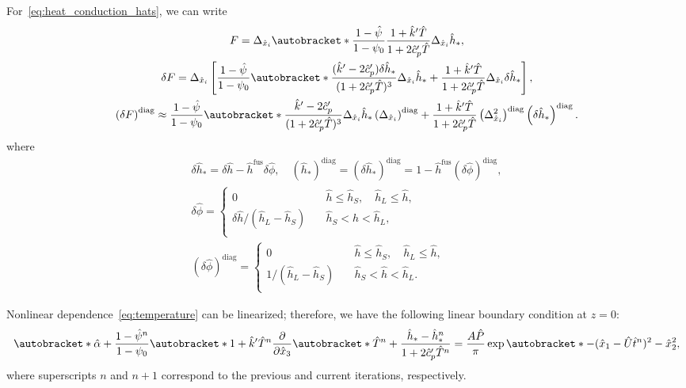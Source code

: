 \documentclass{article}
\newcommand{\dder}[2][]{\Delta_{#2}#1}
\newcommand{\pder}[2][]{\frac{\partial#1}{\partial#2}}
\DeclarePairedDelimiter\autobracket()       %
\newcommand{\br}[1]{\autobracket*{#1}}
\newcommand{\pert}[1]{\delta#1}
\newcommand{\diag}[1]{\left(#1\right)^\mathrm{diag}}
\newcommand{\fusion}[1]{{#1}^\mathrm{fus}}
\begin{document}
For~\eqref{eq:heat_conduction_hats}, we can write
\begin{gather}
    F = \dder{\hat{x}_i}\br{
        \frac{1 - \hat{\psi}}{1 - \psi_0}
	    \frac{1 + \hat{k}'\hat{T}}{1 + 2\hat{c}_p'\hat{T}}
	    \dder[\hat{h}_*]{\hat{x}_i}
	}, \\
    \pert{F} = \dder{\hat{x}_i}\left[ \frac{1 - \hat{\psi}}{1 - \psi_0} \br{
	    \frac{(\hat{k}' - 2\hat{c}_p')\pert{\hat{h}_*}}{(1 + 2\hat{c}_p'\hat{T})^3}
	     \dder[\hat{h}_*]{\hat{x}_i}
	    +
	    \frac{1 + \hat{k}'\hat{T}}{1 + 2\hat{c}_p'\hat{T}}
	    \dder[\pert{\hat{h}_*}]{\hat{x}_i}
	}\right], \\
    \diag{\pert{F}} \approx \frac{1 - \hat{\psi}}{1 - \psi_0} \br{
	    \frac{\hat{k}' - 2\hat{c}_p'}{(1 + 2\hat{c}_p'\hat{T})^3} \dder[\hat{h}_*]{\hat{x}_i} \diag{\dder{\hat{x}_i}}
	    +
	    \frac{1 + \hat{k}'\hat{T}}{1 + 2\hat{c}_p'\hat{T}}
	    \diag{\dder{\hat{x}_i}^2}
	}\diag{\pert{\hat{h}_*}}.
\end{gather}
where
\begin{gather}
    \pert{\hat{h}_*} = \pert{\hat{h}} - \fusion{\hat{h}}\pert{\hat\phi}, \quad
    \diag{\hat{h}_*} = \diag{\pert{\hat{h}_*}} = 1 - \fusion{\hat{h}}\diag{\pert{\hat\phi}}, \\
	\pert{\hat{\phi}} = \begin{cases}
        0 & \quad \hat{h} \leq \hat{h}_S, \quad \hat{h}_L \leq \hat{h}, \\
        \pert{\hat{h}}/(\hat{h}_L-\hat{h}_S) & \quad \hat{h}_S < \hat{h} < \hat{h}_L, \\
    \end{cases} \label{eq:pert_phi_h}\\
	\diag{\pert{\hat{\phi}}} = \begin{cases}
        0 & \quad \hat{h} \leq \hat{h}_S, \quad \hat{h}_L \leq \hat{h}, \\
        1/(\hat{h}_L-\hat{h}_S) & \quad \hat{h}_S < \hat{h} < \hat{h}_L. \\
    \end{cases} \label{eq:pert_phi_h_diag}
\end{gather}

Nonlinear dependence~\eqref{eq:temperature} can be linearized; therefore, we have the following linear boundary condition at \(z=0\):
\begin{equation}\label{eq:bc_linearized}
	\br{ \hat{\alpha} + \frac{1 - \hat{\psi}^n}{1 - \psi_0}\br{ 1 + \hat{k}'\hat{T}^n }\pder{\hat{x}_3} }
	    \br{ \hat{T}^n + \frac{\hat{h}_* - \hat{h}_*^n}{1+2\hat{c}_p'\hat{T}^n} }
	    = \frac{A\hat{P}}{\pi}\exp\br{ -(\hat{x}_1-\hat{U}\hat{t}^n)^2 - \hat{x}_2^2 },
\end{equation}
where superscripts \(n\) and \(n+1\) correspond to the previous and current iterations, respectively.
\end{document}
